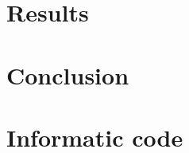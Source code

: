 \documentclass[12pt,a4paper]{article}
\begin{document}


\section{Results}



\section{Conclusion}






\newpage
\appendix
\section{Informatic code}

\end{document}
